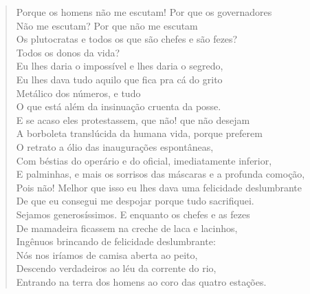 \begin{verse}
Porque os homens não me escutam! Por que os governadores\\
Não me escutam? Por que não me escutam\\
Os plutocratas e todos os que são chefes e são fezes?\\
Todos os donos da vida?\\
Eu lhes daria o impossível e lhes daria o segredo,\\
Eu lhes dava tudo aquilo que fica pra cá do grito\\
Metálico dos números, e tudo\\
O que está além da insinuação cruenta da posse.\\
E se acaso eles protestassem, que não! que não desejam\\
A borboleta translúcida da humana vida, porque preferem\\
O retrato a ólio das inaugurações espontâneas,\\
Com béstias do operário e do oficial, imediatamente inferior,\\
E palminhas, e mais os sorrisos das máscaras e a profunda comoção,\\
Pois não! Melhor que isso eu lhes dava uma felicidade deslumbrante\\
De que eu consegui me despojar porque tudo sacrifiquei.\\
Sejamos generosíssimos. E enquanto os chefes e as fezes\\
De mamadeira ficassem na creche de laca e lacinhos,\\
Ingênuos brincando de felicidade deslumbrante:\\
Nós nos iríamos de camisa aberta ao peito,\\
Descendo verdadeiros ao léu da corrente do rio,\\
Entrando na terra dos homens ao coro das quatro estações.


\end{verse}
